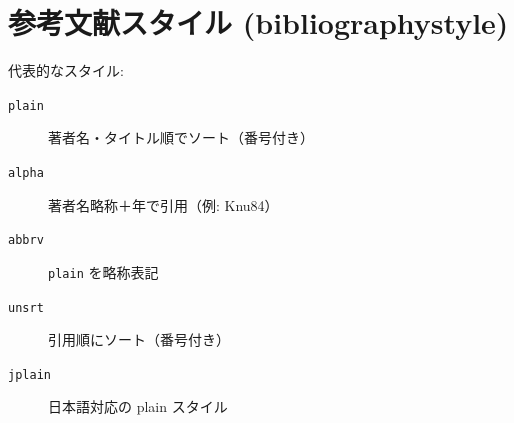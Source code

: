 \documentclass[lualatex,ja=standard]{bxjsarticle}
\begin{document}

\section{参考文献スタイル (bibliographystyle)}

代表的なスタイル:
\begin{description}
  \item[\texttt{plain}]     著者名・タイトル順でソート（番号付き）
  \item[\texttt{alpha}]     著者名略称＋年で引用（例: Knu84）
  \item[\texttt{abbrv}]     \texttt{plain} を略称表記
  \item[\texttt{unsrt}]     引用順にソート（番号付き）
  \item[\texttt{jplain}]    日本語対応の plain スタイル
\end{description}


\end{document}
